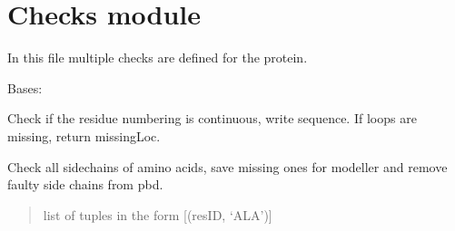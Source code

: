 \documentclass[letterpaper,10pt,english]{sphinxmanual}
\begin{document}
\sphinxstepscope


\section{Checks module}
\label{\detokenize{checks:module-checks}}\label{\detokenize{checks:checks-module}}\label{\detokenize{checks::doc}}
\sphinxAtStartPar
In this file multiple checks are defined for the protein.

\begin{fulllineitems}
\label{\detokenize{checks:checks.CheckProtein}}
\pysigstartsignatures
{}
\pysigstopsignatures
\sphinxAtStartPar
Bases: 

\begin{fulllineitems}
\label{\detokenize{checks:checks.CheckProtein.find_missingLoops}}
\pysigstartsignatures
{}
\pysigstopsignatures
\sphinxAtStartPar
Check if the residue numbering is continuous, write sequence.
If loops are missing, return missingLoc.

\end{fulllineitems}


\begin{fulllineitems}
\label{\detokenize{checks:checks.CheckProtein.find_missingSideChains}}
\pysigstartsignatures
{}
\pysigstopsignatures
\sphinxAtStartPar
Check all sidechains of amino acids, save missing ones for modeller and remove 
faulty side chains from pbd.
\begin{quote}\begin{description}
\sphinxAtStartPar
list of tuples in the form {[}(resID, ‘ALA’){]}


\end{description}
\end{quote}
\end{fulllineitems}
\end{fulllineitems}
\end{document}

